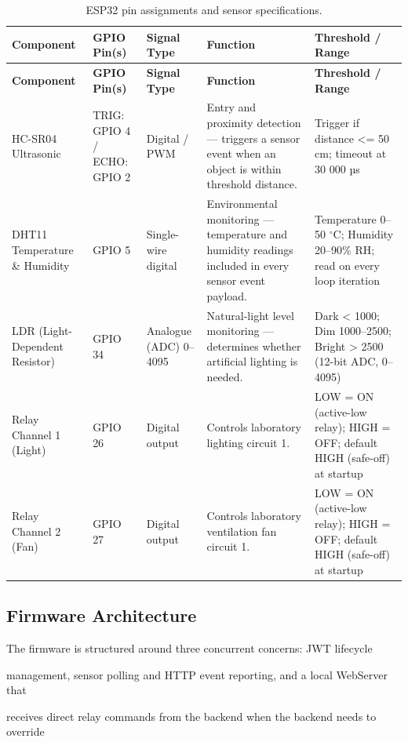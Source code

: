 \begin{longtable}{|L{2.5cm}|L{2.5cm}|L{1.5cm}|L{4.5cm}|L{2.5cm}|}
\caption{ESP32 pin assignments and sensor specifications.} \label{tab:4-2} \\
\hline
{}
\textbf{Component} & \textbf{GPIO Pin(s)} & \textbf{Signal Type} & \textbf{Function} & \textbf{Threshold / Range} \\
\hline
\endfirsthead
\hline
{}
\textbf{Component} & \textbf{GPIO Pin(s)} & \textbf{Signal Type} & \textbf{Function} & \textbf{Threshold / Range} \\
\hline
\endhead
\hline
\endfoot
\hline
\endlastfoot
HC-SR04 Ultrasonic & TRIG: GPIO 4 / ECHO: GPIO 2 & Digital / PWM & Entry and proximity detection --- triggers a sensor event when an object is within threshold distance. & Trigger if distance <= 50 cm; timeout at 30 000 µs \\
\hline
DHT11 Temperature \& Humidity & GPIO 5 & Single-wire digital & Environmental monitoring --- temperature and humidity readings included in every sensor event payload. & Temperature 0--50 $^{\circ}$C; Humidity 20--90\% RH; read on every loop iteration \\
\hline
LDR (Light-Dependent Resistor) & GPIO 34 & Analogue (ADC) 0--4095 & Natural-light level monitoring --- determines whether artificial lighting is needed. & Dark < 1000; Dim 1000--2500; Bright > 2500 (12-bit ADC, 0--4095) \\
\hline
Relay Channel 1 (Light) & GPIO 26 & Digital output & Controls laboratory lighting circuit 1. & LOW = ON (active-low relay); HIGH = OFF; default HIGH (safe-off) at startup \\
\hline
Relay Channel 2 (Fan) & GPIO 27 & Digital output & Controls laboratory ventilation fan circuit 1. & LOW = ON (active-low relay); HIGH = OFF; default HIGH (safe-off) at startup \\
\hline
\end{longtable}

\subsection{Firmware Architecture}
The firmware is structured around three concurrent concerns: JWT lifecycle

management, sensor polling and HTTP event reporting, and a local WebServer that

receives direct relay commands from the backend when the backend needs to override

